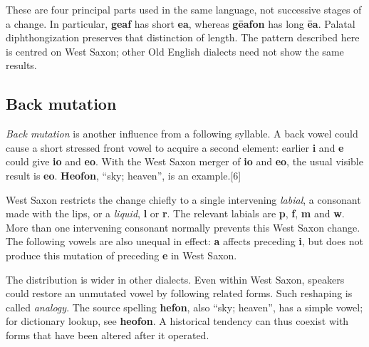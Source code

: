 \endgroup
These are four principal parts used in the same language, not successive stages of a change. In particular, \textbf{geaf} has short \textbf{ea}, whereas \textbf{gēafon} has long \textbf{ēa}. Palatal diphthongization preserves that distinction of length. The pattern described here is centred on West Saxon; other Old English dialects need not show the same results.\par
\subsection*{Back mutation}
\emph{Back mutation} is another influence from a following syllable. A back vowel could cause a short stressed front vowel to acquire a second element: earlier \textbf{i} and \textbf{e} could give \textbf{io} and \textbf{eo}. With the West Saxon merger of \textbf{io} and \textbf{eo}, the usual visible result is \textbf{eo}. \textbf{Heofon}, “sky; heaven”, is an example.[6]\par
West Saxon restricts the change chiefly to a single intervening \emph{labial}, a consonant made with the lips, or a \emph{liquid}, \textbf{l} or \textbf{r}. The relevant labials are \textbf{p}, \textbf{f}, \textbf{m} and \textbf{w}. More than one intervening consonant normally prevents this West Saxon change. The following vowels are also unequal in effect: \textbf{a} affects preceding \textbf{i}, but does not produce this mutation of preceding \textbf{e} in West Saxon.\par
The distribution is wider in other dialects. Even within West Saxon, speakers could restore an unmutated vowel by following related forms. Such reshaping is called \emph{analogy}. The source spelling \textbf{hefon}, also “sky; heaven”, has a simple vowel; for dictionary lookup, see \textbf{heofon}. A historical tendency can thus coexist with forms that have been altered after it operated.\par
